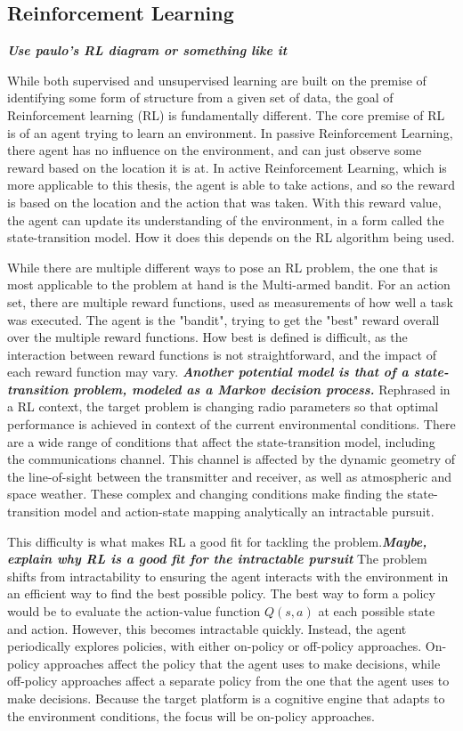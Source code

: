 \documentclass[11pt]{report}
\begin{document}
	\subsection{Reinforcement Learning}
	\textbf{\textit{Use paulo's RL diagram or something like it}}
	\par While both supervised and unsupervised learning are built on the premise of identifying some form of structure from a given set of data, the goal of Reinforcement learning (RL) is fundamentally different. The core premise of RL is of an agent trying to learn an environment. In passive Reinforcement Learning, there agent has no influence on the environment, and can just observe some reward based on the location it is at. In active Reinforcement Learning, which is more applicable to this thesis, the agent is able to take actions, and so the reward is based on the location and the action that was taken. With this reward value, the agent can update its understanding of the environment, in a form called the state-transition model. How it does this depends on the RL algorithm being used.
	\par While there are multiple different ways to pose an RL problem, the one that is most applicable to the problem at hand is the Multi-armed bandit. For an action set, there are multiple reward functions, used as measurements of how well a task was executed. 
	The agent is the "bandit", trying to get the "best" reward overall over the multiple reward functions. How best is defined is difficult, as the interaction between reward functions is not straightforward, and the impact of each reward function may vary. 
	 \textbf{\textit{Another potential model is that of a state-transition problem, modeled as a Markov decision process.}} Rephrased in a RL context, the target problem is changing radio parameters so that optimal performance is achieved in context of the current environmental conditions. There are a wide range of conditions that affect the state-transition model, including the communications channel. This channel is affected by the dynamic geometry of the line-of-sight between the transmitter and receiver, as well as atmospheric and space weather. These complex and changing conditions make finding the state-transition model and action-state mapping analytically an intractable pursuit. 
	\par This difficulty is what makes RL a good fit for tackling the problem.\textbf{\textit{Maybe, explain why RL is a good fit for the intractable pursuit}} The problem shifts from intractability to ensuring the agent interacts with the environment in an efficient way to find the best possible policy. The best way to form a policy would be to evaluate the action-value function $Q(s,a)$ at each possible state and action. However, this becomes intractable quickly. Instead, the agent periodically explores policies, with either on-policy or off-policy approaches. On-policy approaches affect the policy that the agent uses to make decisions, while off-policy approaches affect a separate policy from the one that the agent uses to make decisions. Because the target platform is a cognitive engine that adapts to the environment conditions, the focus will be on-policy approaches. 
\end{document}
